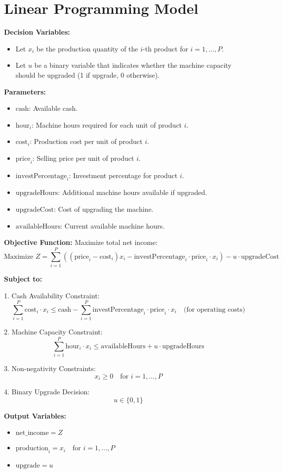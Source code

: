 \documentclass{article}
\begin{document}
\section*{Linear Programming Model}

\textbf{Decision Variables:}
\begin{itemize}
    \item Let \( x_i \) be the production quantity of the \( i \)-th product for \( i = 1, \ldots, P \).
    \item Let \( u \) be a binary variable that indicates whether the machine capacity should be upgraded (1 if upgrade, 0 otherwise).
\end{itemize}

\textbf{Parameters:}
\begin{itemize}
    \item \( \text{cash} \): Available cash.
    \item \( \text{hour}_i \): Machine hours required for each unit of product \( i \).
    \item \( \text{cost}_i \): Production cost per unit of product \( i \).
    \item \( \text{price}_i \): Selling price per unit of product \( i \).
    \item \( \text{investPercentage}_i \): Investment percentage for product \( i \).
    \item \( \text{upgradeHours} \): Additional machine hours available if upgraded.
    \item \( \text{upgradeCost} \): Cost of upgrading the machine.
    \item \( \text{availableHours} \): Current available machine hours.
\end{itemize}

\textbf{Objective Function:}
Maximize total net income:
\[
\text{Maximize } Z = \sum_{i=1}^{P} \left( (\text{price}_i - \text{cost}_i) x_i - \text{investPercentage}_i \cdot \text{price}_i \cdot x_i \right) - u \cdot \text{upgradeCost}
\]

\textbf{Subject to:}

1. Cash Availability Constraint:
\[
\sum_{i=1}^{P} \text{cost}_i \cdot x_i \leq \text{cash} - \sum_{i=1}^{P} \text{investPercentage}_i \cdot \text{price}_i \cdot x_i \quad \text{(for operating costs)}
\]

2. Machine Capacity Constraint:
\[
\sum_{i=1}^{P} \text{hour}_i \cdot x_i \leq \text{availableHours} + u \cdot \text{upgradeHours}
\]

3. Non-negativity Constraints:
\[
x_i \geq 0 \quad \text{for } i = 1, \ldots, P
\]

4. Binary Upgrade Decision:
\[
u \in \{0, 1\}
\]

\textbf{Output Variables:}
\begin{itemize}
    \item \( \text{net\_income} = Z \)
    \item \( \text{production}_i = x_i \quad \text{for } i = 1, \ldots, P \)
    \item \( \text{upgrade} = u \)
\end{itemize}
\end{document}
